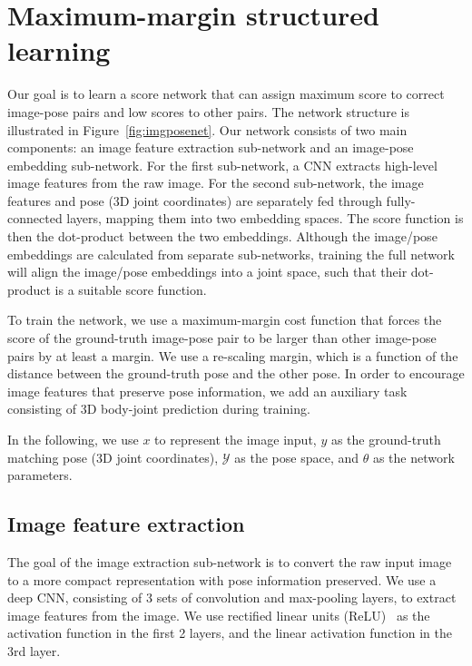 \documentclass[10pt,twocolumn,letterpaper]{article}
\begin{document}
 \section{Maximum-margin structured learning}
\label{sec:structnet}
Our goal is to learn a score network that can assign maximum score to  correct image-pose pairs and low scores to other pairs.
The network structure is illustrated in Figure~\ref{fig:imgposenet}.
Our network consists of two main components: an image feature extraction sub-network and an image-pose embedding sub-network.
For the first sub-network, a CNN extracts high-level image features from the raw image.
For the second sub-network, 
the image features and pose (3D joint coordinates) are separately fed through fully-connected layers, mapping them into two embedding spaces. The score function is then the dot-product between the two embeddings.
Although the image/pose embeddings are calculated from separate sub-networks, training the full network will align the image/pose embeddings into a joint space, such that their dot-product is a suitable score function.



To train the network, we use a maximum-margin cost function that forces the score
of the ground-truth image-pose pair to be larger than other image-pose pairs by at least a margin.  We use a re-scaling margin, which is a function of the distance between the ground-truth pose and the other pose.
In order to encourage image features that preserve pose information, we add an auxiliary task consisting of 3D body-joint prediction during training.


In the following, we use $x$ to represent the image input, $y$ as the ground-truth matching pose (3D joint coordinates), $\mathcal{Y}$ as the pose space, and $\theta$ as the network parameters.


\subsection{Image feature extraction}
\vspace{-0.05in}
The goal of the image extraction sub-network is to convert the raw input image to a more compact representation with pose information preserved.
We use a deep CNN, consisting of 3 sets of convolution and max-pooling layers,  to extract image features from the image.
We use rectified linear units (ReLU)~\cite{relu2010} as the activation function in the first 2 layers, and the linear activation function in the 3rd  layer.
\end{document}
